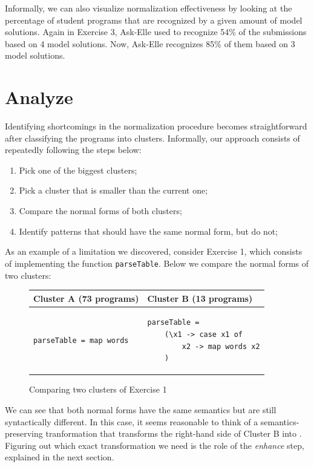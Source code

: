 Informally, we can also visualize normalization effectiveness by looking at the percentage of student programs that are recognized by a given amount of model solutions. Again in Exercise 3, Ask-Elle used to recognize 54\% of the submissions based on 4 model solutions. Now, Ask-Elle recognizes 85\% of them based on 3 model solutions.

\section{Analyze}

Identifying shortcomings in the normalization procedure becomes straightforward after classifying the programs into clusters. Informally, our approach consists of repeatedly following the steps below:

\begin{enumerate}
\item Pick one of the biggest clusters;
\item Pick a cluster that is smaller than the current one;
\item Compare the normal forms of both clusters;
\item Identify patterns that should have the same normal form, but do not;
\end{enumerate}

As an example of a limitation we discovered, consider Exercise 1, which consists of implementing the function \texttt{parseTable}. Below we compare the normal forms of two clusters:

\begin{figure}[H]
\centering
\begin{tabular}{ m{13em} | m{13em} }
    Cluster A (73 programs) & Cluster B (13 programs) \\
    \hline
    \begin{verbatim}
parseTable = map words
    \end{verbatim}
    &
    \begin{verbatim}
parseTable =
    (\x1 -> case x1 of
        x2 -> map words x2
    )
    \end{verbatim}
\end{tabular}
\caption{Comparing two clusters of Exercise 1}
\label{fig:method-comparing-clusters}
\end{figure}

We can see that both normal forms have the same semantics but are still syntactically different. In this case, it seems reasonable to think of a semantics-preserving tranformation that transforms the right-hand side of Cluster B into . Figuring out which exact transformation we need is the role of the \emph{enhance} step, explained in the next section.

